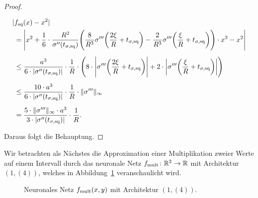 \begin{proof}
\begin{itemize}
\begin{equation*}
  	\begin{split}
  	 & |f_{\mathrm{sq}}(x) - x^2| \\
  	& \; = \Bigg|x^2 + \frac{1}{6} \cdot \frac{R^2}{\sigma''(t_{\sigma,\mathrm{sq}})} \Bigg(\frac{8}{R^3}\sigma'''\bigg(\frac{2\xi}{R} + t_{\sigma,\mathrm{sq}}\bigg) - \frac{2}{R^3} \sigma'''\bigg(\frac{\xi}{R} + t_{\sigma,\mathrm{sq}}\bigg)\Bigg) \cdot x^3 - x^2\Bigg| \\[0.5em]
  	& \; \leq \frac{a^3}{6 \cdot |\sigma''(t_{\sigma,\mathrm{sq}})|} \cdot \frac{1}{R} \cdot \Bigg(8 \cdot \Bigg|\sigma'''\bigg(\frac{2\xi}{R} + t_{\sigma,\mathrm{sq}}\bigg)\Bigg| + 2 \cdot \bigg|\sigma'''\bigg(\frac{\xi}{R} + t_{\sigma,\mathrm{sq}}\bigg)\bigg|\Bigg) \\[0.5em]
  	& \; \leq \frac{10 \cdot a^3}{6 \cdot |\sigma''(t_{\sigma,\mathrm{sq}})|} \cdot \frac{1}{R} \cdot \|\sigma'''\|_{\infty} \\[0.5em]
  	& \; = \frac{5 \cdot \|\sigma'''\|_{\infty} \cdot a^3}{3 \cdot |\sigma''(t_{\sigma, \mathrm{sq}})|} \cdot \frac{1}{R}. 
  	\end{split}
  	\end{equation*}
 	\end{itemize}
 	Daraus folgt die Behauptung.
\end{proof}
Wir betrachten als Nächstes die Approximation einer Multiplikation zweier Werte auf einem Intervall durch das neuronale Netz $f_{\mathrm{mult}}\colon \mathbb{R}^2 \to \mathbb{R}$ mit Architektur~$(1,(4))$, welches in Abbildung~\ref{fig:fmult} veranschaulicht wird.
\begin{figure}[htp]
\centering
{}

\caption{Neuronales Netz $f_{\mathrm{mult}}(x, y)$ mit Architektur $(1,(4))$.}
\label{fig:fmult}
\end{figure}

